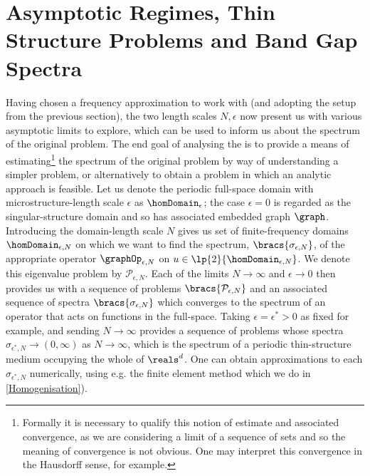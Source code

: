 \section{Asymptotic Regimes, Thin Structure Problems and Band Gap Spectra} \label{sec:AsymRegimes}
Having chosen a frequency approximation to work with (and adopting the setup from the previous section), the two length scales $N, \epsilon$ now present us with various asymptotic limits to explore, which can be used to inform us about the spectrum of the original problem.
The end goal of analysing the  is to provide a means of estimating\footnote{Formally it is necessary to qualify this notion of estimate and associated convergence, as we are considering a limit of a sequence of sets and so the meaning of convergence is not obvious. One may interpret this convergence in the Hausdorff sense, for example.} the spectrum of the original problem by way of understanding a simpler problem, or alternatively to obtain a problem in which an analytic approach is feasible.
Let us denote the periodic full-space domain with microstructure-length scale $\epsilon$ as $\homDomain_{\epsilon}$; the case $\epsilon=0$ is regarded as the singular-structure domain and so has associated embedded graph $\graph$.
Introducing the domain-length scale $N$ gives us set of finite-frequency domains $\homDomain_{\epsilon, N}$ on which we want to find the spectrum, $\bracs{\sigma_{\epsilon, N}}$, of the appropriate operator $\graphOp_{\epsilon, N}$ on $u\in\lp{2}{\homDomain_{\epsilon, N}}$.
We denote this eigenvalue problem by $\mathcal{P}_{\epsilon, N}$.
Each of the limits $N\rightarrow\infty$ and $\epsilon\rightarrow0$ then provides us with a sequence of problems $\bracs{\mathcal{P}_{\epsilon, N}}$ and an associated sequence of spectra $\bracs{\sigma_{\epsilon, N}}$ which converges to the spectrum of an operator that acts on functions in the full-space.
Taking $\epsilon=\epsilon^{*}>0$ as fixed for example, and sending $N\rightarrow\infty$ provides a sequence of problems whose spectra $\sigma_{\epsilon^{*}, N}\rightarrow(0,\infty)$ as $N\rightarrow\infty$, which is the spectrum of a periodic thin-structure medium occupying the whole of $\reals^{d}$. 
One can obtain approximations to each $\sigma_{\epsilon^{*}, N}$ numerically, using e.g. the finite element method which we do in \cref{Homogenisation}). \newline

